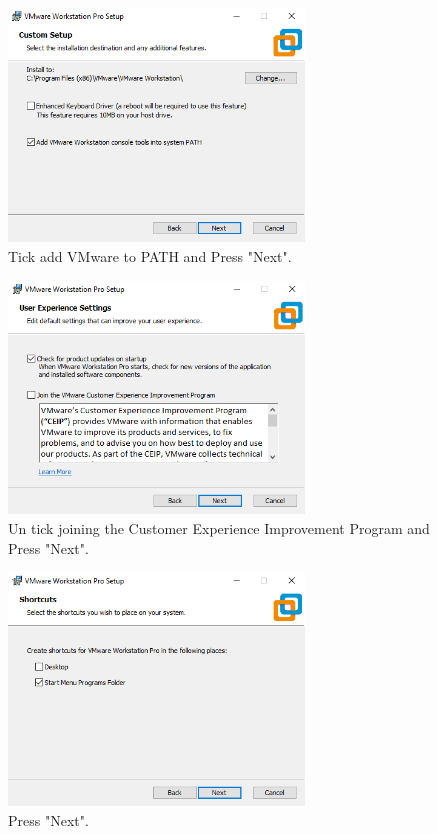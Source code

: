 \documentclass[a4paper]{article}
\begin{document}
    \vfill

    \begin{figure}
        \centering
        \includegraphics[width=0.7\textwidth]{Images/Install_VMware/Install_VMware_3.png}
        \caption{Tick add VMware to PATH and Press "Next".}    
    \end{figure}
    \clearpage    
    \begin{figure}
        \centering
        \includegraphics[width=0.7\textwidth]{Images/Install_VMware/Install_VMware_4.png}
        \caption{Un tick joining the Customer Experience Improvement Program and Press "Next".}    
    \end{figure}

    \vfill

    \begin{figure}
        \centering
        \includegraphics[width=0.7\textwidth]{Images/Install_VMware/Install_VMware_5.png}
        \caption{Press "Next".}   
    \end{figure}
    
\end{document}
